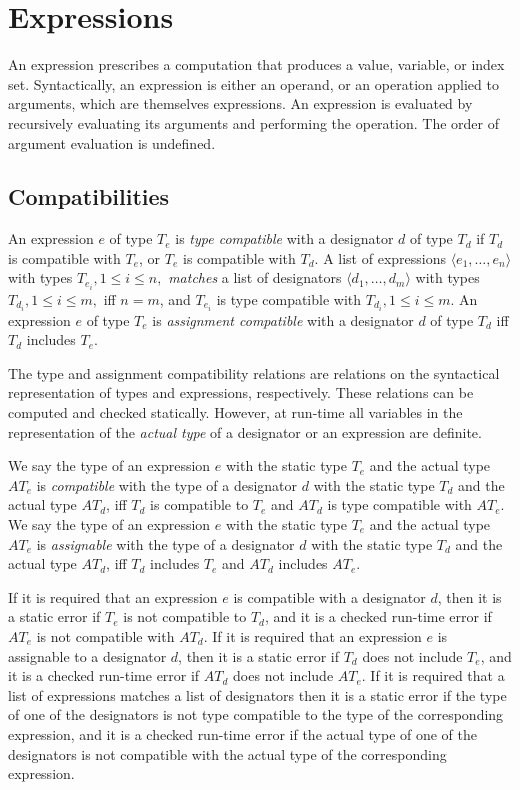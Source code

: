 
\section{Expressions}

An expression prescribes a computation that produces a value,
variable, or index set. Syntactically, an expression is either an
operand, or an operation applied to arguments, which are themselves
expressions. An expression is evaluated by recursively evaluating its
arguments and performing the operation. The order of argument
evaluation is undefined.

\subsection*{Compatibilities}

An expression $e$ of type $T_e$ is {\em type compatible} with a
designator $d$ of type $T_d$ if $T_d$ is compatible with $T_e$, or
$T_e$ is compatible with $T_d$. A list of expressions $\langle
e_1,\ldots,e_n\rangle$ with types $T_{e_i}, 1 \leq i \leq n,$ {\em
matches} a list of designators $\langle d_1,\ldots,d_m\rangle$ with
types $T_{d_i}, 1 \leq i \leq m,$ iff $n = m$, and $T_{e_i}$ is type
compatible with $T_{d_i}, 1 \leq i \leq m.$ An expression $e$ of type
$T_e$ is {\em assignment compatible} with a designator $d$ of type
$T_d$ iff $T_d$ includes $T_e$.

The type and assignment compatibility relations are relations on the
syntactical representation of types and expressions, respectively.
These relations can be computed and checked statically. However, at
run-time all variables in the representation of the {\em actual type}
of a designator or an expression are definite.

We say the type of an expression $e$ with the static type $T_e$ and
the actual type $AT_e$ is {\em compatible} with the type of a
designator $d$ with the static type $T_d$ and the actual type $AT_d$,
iff $T_d$ is compatible to $T_e$ and $AT_d$ is type compatible with
$AT_e$. We say the type of an expression $e$ with the static type
$T_e$ and the actual type $AT_e$ is {\em assignable} with the type of
a designator $d$ with the static type $T_d$ and the actual type
$AT_d$, iff $T_d$ includes $T_e$ and $AT_d$ includes $AT_e$.

If it is required that an expression $e$ is compatible with a
designator $d$, then it is a static error if $T_e$ is not compatible to
$T_d$, and it is a checked run-time error if $AT_e$ is not compatible
with $AT_d$. If it is required that an expression $e$ is assignable to
a designator $d$, then it is a static error if $T_d$ does not include
$T_e$, and it is a checked run-time error if $AT_d$ does not include
$AT_e$. If it is required that a list of expressions matches a list of
designators then it is a static error if the type of one of the
designators is not type compatible to the type of the corresponding
expression, and it is a checked run-time error if the actual type of
one of the designators is not compatible with the actual type of the
corresponding expression.


